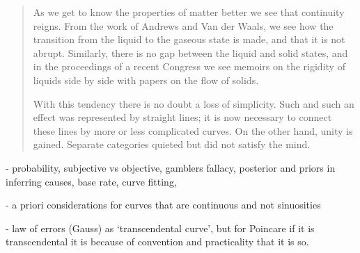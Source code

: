 \documentclass{article}
\begin{document}
 \begin{quote}
     As we get to know the properties of matter better we see that continuity reigns.  From the work of Andrews and Van der Waals, we see how the transition from the liquid to the gaseous state is made, and that it is not abrupt.  Similarly, there is no gap between the liquid and solid states, and in the proceedings of a recent Congress we see memoirs on the rigidity of liquids side by side with papers on the flow of solids.  
     
     With this tendency there is no doubt a loss of simplicity.  Such and such an effect was represented by straight lines; it is now necessary to connect these lines by more or less complicated curves.  On the other hand, unity is gained.  Separate categories quieted but did not satisfy the mind.  
     
     \citep[p. 181-182]{Poincare1952}
 \end{quote}
 
 - probability, subjective vs objective, gamblers fallacy, posterior and priors in inferring causes, base rate, curve fitting, 
 
 - a priori considerations for curves that are continuous and not sinuosities
 
 - law of errors (Gauss) as `transcendental curve', but for Poincare if it is transcendental it is because of convention and practicality that it is so.
 
\end{document}
